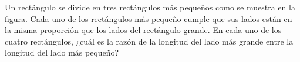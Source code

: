 Un rectángulo se divide en tres rectángulos más pequeños como se muestra en la figura. Cada uno de los rectángulos más pequeño cumple que sus lados están en la misma proporción que los lados del rectángulo grande. En cada uno de los cuatro rectángulos, ¿cuál es la razón de la longitud del lado más grande entre la longitud del lado más pequeño?